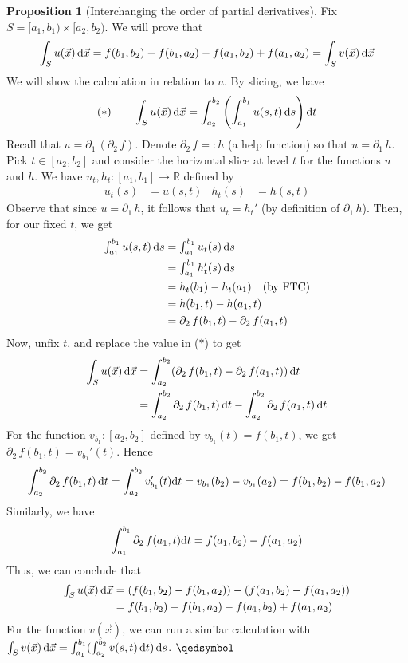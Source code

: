 \documentclass[11pt]{article}
\theoremstyle{definition}
\newtheorem{prop}[thm]{Proposition}
\newcommand{\R}{\ensuremath{\mathbb{R}}}
\begin{document}
\begin{prop}[Interchanging the order of partial derivatives]
Fix $S = [a_1, b_1) \times [a_2, b_2)$. We will prove that
$$\int_S u(\vec{x})\,{\rm d}\vec{x} = f(b_1, b_2) - f(b_1, a_2) - f(a_1, b_2) + f(a_1, a_2) = \int_S v(\vec{x})\,{\rm d}\vec{x}$$ 
We will show the calculation in relation to $u$. By slicing, we have
$$(*) \qquad \int_S u(\vec{x})\,{\rm d}\vec{x} = \int_{a_2}^{b_2} \left( \int_{a_1}^{b_1} u(s, t)\,{\rm d}s \right) {\rm d}t$$
Recall that $u = \partial_1 \, (\partial_2\,f)$. Denote $\partial_2\,f =: h$ (a help function) so that $u = \partial_1\,h$. Pick $t \in [a_2, b_2]$ and consider the horizontal slice at level $t$ for the functions $u$ and $h$. We have $u_t, h_t : [a_1, b_1] \to \R$ defined by
\begin{align*}
    u_t(s) &= u(s, t) & h_t(s) &= h(s, t) 
\end{align*}
Observe that since $u = \partial_1\,h$, it follows that $u_t = h_t'$ (by definition of $\partial_1\,h$). Then, for our fixed $t$, we get
\begin{align*}
    \textstyle\int_{a_1}^{b_1} u(s, t)\,{\rm d}s 
    &= \textstyle\int_{a_1}^{b_1} u_t(s)\,{\rm d}s \\
    &= \textstyle\int_{a_1}^{b_1} h_t'(s)\,{\rm d}s \\
    &= h_t(b_1) - h_t(a_1) \quad \text{(by FTC)} \\
    &= h(b_1, t) - h(a_1, t) \\
    &= \partial_2\,f(b_1, t) - \partial_2\,f(a_1, t)
\end{align*}
Now, unfix $t$, and replace the value in ($*$) to get
\begin{align*}
    \int_S u(\vec{x})\,{\rm d}\vec{x} &= \int_{a_2}^{b_2} (\partial_2\,f(b_1, t) - \partial_2\,f(a_1, t))\,{\rm d}t \\
    &= \int_{a_2}^{b_2} \partial_2\,f(b_1, t)\,{\rm d}t - \int_{a_2}^{b_2} \partial_2\,f(a_1, t)\,{\rm d}t
\end{align*}
For the function $v_{b_1} : [a_2, b_2]$ defined by $v_{b_1}(t) = f(b_1, t)$, we get $\partial_2\,f(b_1, t) = v_{b_1}'(t)$. Hence
$$\int_{a_2}^{b_2} \partial_2\,f(b_1, t)\,{\rm d}t = \int_{a_2}^{b_2} v_{b_1}'(t){\rm d}t = v_{b_1}(b_2) - v_{b_1}(a_2) = f(b_1, b_2) - f(b_1, a_2)$$
Similarly, we have
$$\int_{a_1}^{b_1} \partial_2\,f(a_1, t){\rm d}t = f(a_1, b_2) - f(a_1, a_2)$$
Thus, we can conclude that
\begin{align*}
    \textstyle\int_S u(\vec{x})\,{\rm d}\vec{x} &= (f(b_1, b_2) - f(b_1, a_2)) - (f(a_1, b_2) - f(a_1, a_2)) \\ &= f(b_1, b_2) - f(b_1, a_2) - f(a_1, b_2) + f(a_1, a_2)
\end{align*}
For the function $v(\vec{x})$, we can run a similar calculation with $\int_S v(\vec{x})\,{\rm d}\vec{x} = \int_{a_1}^{b_1} ( \int_{a_2}^{b_2} v(s, t)\,{\rm d}t)\,{\rm d}s$. \hfill $\qedsymbol$
\end{prop}
\end{document}
